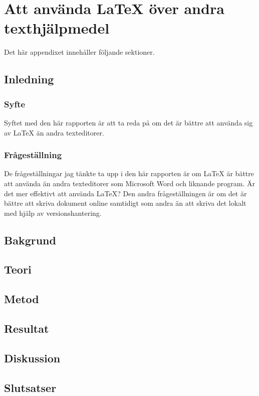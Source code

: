 \chapter{Att använda LaTeX över andra texthjälpmedel}
\label{cha:indiv-report-person}

Det här appendixet innehåller följande sektioner.

\section{Inledning}
\label{sec:introduction-tuhkala}


\subsection{Syfte}
\label{sec:purpose-tuhkala}
Syftet med den här rapporten är att ta reda på om det är bättre att använda sig av LaTeX än andra texteditorer. 

\subsection{Frågeställning}
\label{sec:issue-tuhkala}
De frågeställningar jag tänkte ta upp i den här rapporten är om LaTeX är bättre att använda än andra texteditorer som Microsoft Word och liknande program. Är det mer effektivt att använda LaTeX? Den andra frågeställningen är om det är bättre att skriva dokument online samtidigt som andra än att skriva det lokalt med hjälp av versionshantering.

\section{Bakgrund}
\label{sec:background-tuhkala}


\section{Teori}
\label{sec:theory-tuhkala}


\section{Metod}
\label{sec:method-tuhkala}


\section{Resultat}
\label{sec:results-tuhkala}


\section{Diskussion}
\label{sec:discussion-tuhkala}


\section{Slutsatser}
\label{sec:conclusions-tuhkala}


